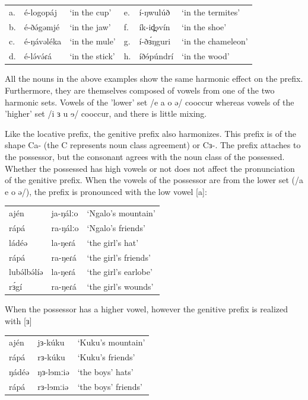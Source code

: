 \ea
\begin{tabular}[t]{llllll}
	a.&	é-logopáj		&	‘in the cup’		
	&	e.&	í-ŋwulúð	&	‘in the termites’\\
	b.&	é-ðə́gəmjé		&	‘in the jaw’		&	f.&	ík-id̪ɘvín	&	‘in the shoe’\\
	c.&	é-ŋávəléka		&	‘in the mule’		&	g.&	í-ðɜ́ŋguri	&	‘in the chameleon’\\
	d.&	é-lə́və́ɾá 		&	‘in the stick’	&	h.&	íðɘ́púndrí	&	‘in the wood’ \\
\end{tabular}
\z


All the nouns in the above examples show the same harmonic effect on the prefix. Furthermore, they  are themselves composed of vowels from one of the two harmonic sets. Vowels of the 'lower' set /e a o ə/ cooccur whereas vowels of the 'higher' set /i ɜ u ɘ/ cooccur, and there is little mixing.  

Like the locative prefix, the genitive prefix also harmonizes. This prefix is of the shape Ca- (the C represents noun class agreement) or Cɜ-. The prefix attaches to the possessor, but the consonant agrees with the noun class of the possessed. Whether the possessed has high vowels or not does not affect the pronunciation of the genitive prefix. When the vowels of the possessor are from the lower set (/a e o ə/), the prefix is pronounced with the low vowel [a]:

\ea
\begin{tabular}[t]{lll}
	ajén 	&	ja-ŋálːo	&	‘Ngalo’s mountain’\\
	rápá 	&	ra-ŋálːo	&	‘Ngalo’s friends’\\
	ládéə 	&	la-ŋeɾá		&	‘the girl’s hat’\\
	rápá 	&	ra-ŋeɾá		&	‘the girl’s friends’	\\
	lubə́lbə́líə&	la-ŋeɾá		&	‘the girl’s earlobe’\\
	rɜ́gí 	&	ra-ŋeɾá		&	‘the girl’s wounds’\\
\end{tabular}
\z

When the possessor has a higher vowel, however the genitive prefix is realized with [ɜ]
\ea
\begin{tabular}[t]{lll}
	ajén 	&	jɜ-kúku		&	‘Kuku’s mountain’\\
	rápá 	&	rɜ-kúku		&	‘Kuku’s friends’\\
	ŋádéə 	&	ŋɜ-lɘmːiə	&	‘the boys’ hats’\\
	rápá 	&	rɜ-lɘmːiə	&	‘the boys’ friends’\\
\end{tabular}
\z

